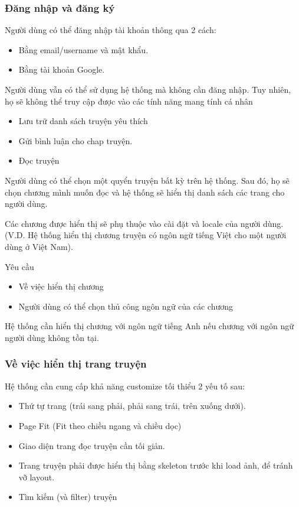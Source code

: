 \documentclass[./../main.tex]{subfiles}
\begin{document}
\subsubsection{Đăng nhập và đăng ký}

Người dùng có thể đăng nhập tài khoản thông qua 2 cách:
\begin{itemize}
\item Bằng email/username và mật khẩu.
\item Bằng tài khoản Google.
\end{itemize}
Người dùng vẫn có thể sử dụng hệ thống mà không cần đăng nhập.
Tuy nhiên, họ sẽ không thể truy cập được vào các tính năng mang tính cá nhân
\begin{itemize}
\item Lưu trữ danh sách truyện yêu thích
\item Gửi bình luận cho chap truyện.
\item Đọc truyện
\end{itemize}
Người dùng có thể chọn một quyển truyện bất kỳ trên hệ thống.
Sau đó, họ sẽ chọn chương mình muốn đọc và hệ thống sẽ hiển thị danh sách các trang cho người dùng.


Các chương được hiển thị sẽ phụ thuộc vào cài đặt và locale của người dùng.
(V.D. Hệ thống hiển thị chương truyện có ngôn ngữ tiếng Việt cho một người dùng ở Việt Nam).


Yêu cầu
\begin{itemize}
\item Về việc hiển thị chương
\item Người dùng có thể chọn thủ công ngôn ngữ của các chương
\end{itemize}
Hệ thống cần hiển thị chương với ngôn ngữ tiếng Anh nếu chương với ngôn ngữ người dùng không tồn tại.

\subsubsection{Về việc hiển thị trang truyện}

Hệ thống cần cung cấp khả năng customize tối thiểu 2 yếu tố sau:
\begin{itemize}
\item Thứ tự trang (trái sang phải, phải sang trái, trên xuống dưới).
\item Page Fit (Fit theo chiều ngang và chiều dọc)
\item Giao diện trang đọc truyện cần tối giản.
\item Trang truyện phải được hiển thị bằng skeleton trước khi load ảnh, để tránh vỡ layout.
\item Tìm kiếm (và filter) truyện
\end{itemize}
\end{document}
